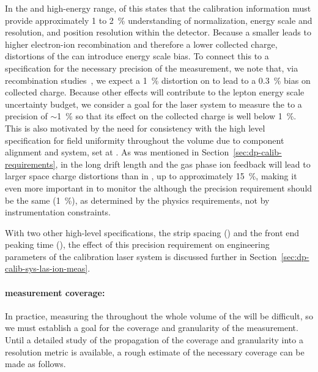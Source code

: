 In the  and high-energy range, \physchlbl of this 
states that the calibration information must provide approximately \num{1} to \SI{2}{\%} understanding of normalization, energy scale and resolution, and position resolution within the detector.
Because a smaller \efield leads to higher electron-ion recombination and therefore a lower collected charge, distortions of the \efield can introduce
energy scale bias. To connect this
to a specification for the necessary precision of the \efield measurement, we note that, via recombination studies~\cite{bib:mooney2018}, we expect a \SI{1}{\%} distortion on \efield to lead to a \SI{0.3}{\%} bias on collected charge.
Because other effects will contribute to the lepton energy scale uncertainty budget, we consider a goal for the 
laser system to measure the \efield to a precision of $\sim$\SI{1}{\%} so that its effect on the collected charge is well below \SI{1}{\%}.
This is also motivated by the need for consistency with the high level  specification for field uniformity throughout the volume due to component alignment and  system, set at \fielduniformity. As was mentioned in Section~\ref{sec:dp-calib-requirements}, in  the long drift length and the gas phase ion feedback will lead to larger space charge \efield distortions than in , up to approximately \SI{15}{\%}, making it even more important in  to monitor the \efield although the precision requirement should be the same (\SI{1}{\%}), as determined by the physics requirements, not by instrumentation constraints.

With two other high-level  specifications, the  strip spacing (\dpstrippitch) and the front end peaking time (\fepeaktime), the effect of this \efield precision requirement on engineering parameters of the calibration laser system is discussed further %
in Section~\ref{sec:dp-calib-sys-las-ion-meas}.

\paragraph{\efield measurement coverage:}

In practice, measuring the \efield  throughout the whole volume of the  will be difficult, so we must establish a goal for the coverage and granularity of the measurement. 
Until a detailed study of the propagation of the coverage and granularity into a resolution metric is available, a rough estimate of the necessary coverage can be made as follows.

